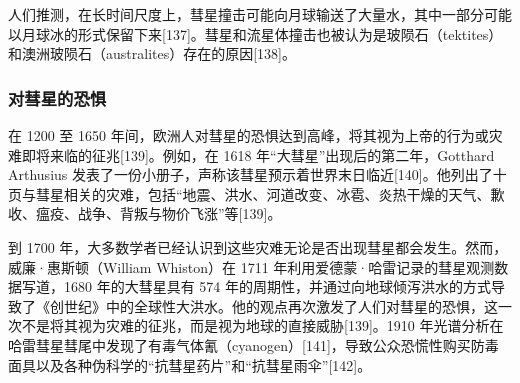 人们推测，在长时间尺度上，彗星撞击可能向月球输送了大量水，其中一部分可能以月球冰的形式保留下来[137]。彗星和流星体撞击也被认为是玻陨石（tektites）和澳洲玻陨石（australites）存在的原因[138]。
\subsubsection{对彗星的恐惧}
在 1200 至 1650 年间，欧洲人对彗星的恐惧达到高峰，将其视为上帝的行为或灾难即将来临的征兆[139]。例如，在 1618 年“大彗星”出现后的第二年，Gotthard Arthusius 发表了一份小册子，声称该彗星预示着世界末日临近[140]。他列出了十页与彗星相关的灾难，包括“地震、洪水、河道改变、冰雹、炎热干燥的天气、歉收、瘟疫、战争、背叛与物价飞涨”等[139]。

到 1700 年，大多数学者已经认识到这些灾难无论是否出现彗星都会发生。然而，威廉·惠斯顿（William Whiston）在 1711 年利用爱德蒙·哈雷记录的彗星观测数据写道，1680 年的大彗星具有 574 年的周期性，并通过向地球倾泻洪水的方式导致了《创世纪》中的全球性大洪水。他的观点再次激发了人们对彗星的恐惧，这一次不是将其视为灾难的征兆，而是视为地球的直接威胁[139]。1910 年光谱分析在哈雷彗星彗尾中发现了有毒气体氰（cyanogen）[141]，导致公众恐慌性购买防毒面具以及各种伪科学的“抗彗星药片”和“抗彗星雨伞”[142]。



